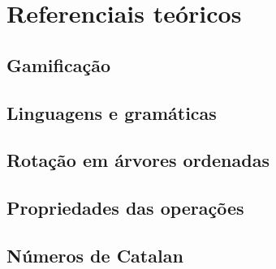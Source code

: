 \part{Referenciais teóricos}

\chapter{Gamificação}

\chapter{Linguagens e gramáticas}

\chapter{Rotação em árvores ordenadas}

\chapter{Propriedades das operações}

\chapter{Números de Catalan}
